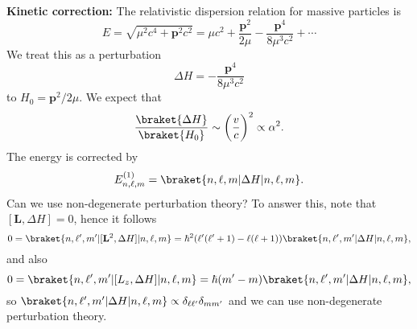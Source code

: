 \documentclass[12pt]{article}
\begin{document}
\textbf{Kinetic correction:} The relativistic dispersion relation for massive particles is
\[
	E = \sqrt{\mu^2 c^4 + \mathbf{p}^2 c^2} = \mu c^2 + \frac{\mathbf{p}^2}{2 \mu} - \frac{\mathbf{p}^4}{8 \mu^3 c^2} + \cdots
\]
We treat this as a perturbation
\[
\Delta H = - \frac{\mathbf{p}^4}{8 \mu^3 c^2}
\]
to $H_0 = \mathbf{p}^2/2\mu$. We expect that
\[
	\frac{\braket{\Delta H}}{\braket{H_0}} \sim \biggl(\frac{v}{c} \biggr)^2 \propto \alpha^2.
\]
The energy is corrected by
\[
	E_{n, \ell, m}^{(1)} = \braket{n, \ell, m|\Delta H|n, \ell, m}.
\]
Can we use non-degenerate perturbation theory? To answer this, note that $[\mathbf{L}, \Delta H] = 0$, hence it follows
\[
	0 = \braket{n, \ell', m'|[\mathbf{L}^2, \Delta H] | n, \ell, m} = \hbar^2(\ell'(\ell'+1) - \ell(\ell+1)) \braket{n, \ell', m'|\Delta H|n, \ell, m},
\]
and also
\[
	0 = \braket{n, \ell', m'|[L_z, \Delta H]|n, \ell, m} = \hbar(m' - m) \braket{n, \ell', m'|\Delta H|n, \ell, m},
\]
so $\braket{n, \ell', m'|\Delta H|n, \ell, m} \propto \delta_{\ell \ell'}\delta_{m m'}$ and we can use non-degenerate perturbation theory.
\end{document}
